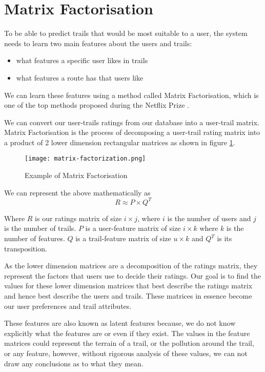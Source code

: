 \section{Matrix Factorisation} \label{matrixFactorization}
To be able to predict trails that would be most suitable to a user, the system needs to learn two main features about the users and trails:
\begin{itemize}
    \item what features a specific user likes in trails
    \item what features a route has that users like
\end{itemize}
We can learn these features using a method called Matrix Factorisation, which is one of the top methods proposed during the Netflix Prize \cite{bell2007lessons}.

We can convert our user-trails ratings from our database into a user-trail matrix. Matrix Factorisation is the process of decomposing a user-trail rating matrix into a product of 2 lower dimension rectangular matrices \cite{koren2009bellkor} as shown in figure \ref{fig:matrixFactorization}.

\begin{figure}[ht]
    \centering
    \texttt{[image: matrix-factorization.png]}
    \caption{Example of Matrix Factorisation}
    \label{fig:matrixFactorization}
\end{figure}

We can represent the above mathematically as 
\begin{equation}
    R \approx P \times Q^T
\end{equation}

Where $R$ is our ratings matrix of size $i \times j$, where $i$ is the number of users and $j$ is the number of trails. $P$ is a user-feature matrix of size $i \times k$ where $k$ is the number of features. $Q$ is a trail-feature matrix of size $u \times k$ and $Q^T$ is its transposition.

As the lower dimension matrices are a decomposition of the ratings matrix, they represent the factors that users use to decide their ratings. Our goal is to find the values for these lower dimension matrices that best describe the ratings matrix and hence best describe the users and trails. These matrices in essence become our user preferences and trail attributes.

These features are also known as \Gls{latent} features because, we do not know explicitly what the features are or even if they exist. The values in the feature matrices could represent the terrain of a trail, or the pollution around the trail, or any feature, however, without rigorous analysis of these values, we can not draw any conclusions as to what they mean.


